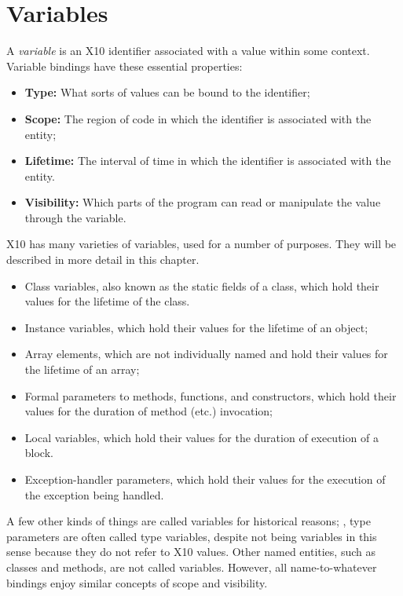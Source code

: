 \chapter{Variables}\label{XtenVariables}


A {\em variable} is an X10 identifier associated with a value within some
context. Variable bindings have these essential properties:
\begin{itemize}
\item {\bf Type:} What sorts of values can be bound to the identifier;
\item {\bf Scope:} The region of code in which the identifier is associated
      with the entity;
\item {\bf Lifetime:} The interval of time in which the identifier is
      associated with the entity.
\item {\bf Visibility:} Which parts of the program can read or manipulate the
      value through the variable.
\end{itemize}



X10 has many varieties of variables, used for a number of purposes. They will
be described in more detail in this chapter.  
\begin{itemize}
\item Class variables, also known as the static fields of a class, which hold
      their values for the lifetime of the class.  
\item Instance variables, which hold their values for the lifetime of an
      object;
\item Array elements, which are not individually named and hold their values
      for the lifetime of an array;
\item Formal parameters to methods, functions, and constructors, which hold
      their values for the duration of method (etc.) invocation;
\item Local variables, which hold their values for the duration of execution
      of a block.
\item Exception-handler parameters, which hold their values for the execution
      of the exception being handled. 
\end{itemize}
A few other kinds of things are called variables for historical reasons; \eg,
type parameters are often called type variables, despite not being variables
in this sense because they do not refer to X10 values.  Other named entities,
such as classes and methods, are not called variables.  However, all
name-to-whatever bindings enjoy similar concepts of scope and visibility.  

